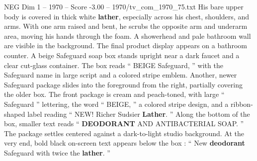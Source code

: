 \begin{textsample}{NEG Dim 1 – 1970 – Score -3.00 – 1970/tv\_com\_1970\_75.txt}
His bare upper body is covered in thick white \textbf{lather}, especially across his chest, shoulders, and arms.
With one arm raised and bent, he scrubs the opposite arm and underarm area, moving his hands through the foam.
A showerhead and pale bathroom wall are visible in the background.
The final product display appears on a bathroom counter.
A beige Safeguard soap box stands upright near a dark faucet and a clear cut-glass container.
The box reads “ BEIGE Safeguard, ” with the Safeguard name in large script and a colored stripe emblem.
Another, newer Safeguard package slides into the foreground from the right, partially covering the older box.
The front package is cream and peach-toned, with large “ Safeguard ” lettering, the word “ BEIGE, ” a colored stripe design, and a ribbon-shaped label reading “ NEW!
Richer Sudsier \textbf{Lather}. ” Along the bottom of the box, smaller text reads “ \textbf{DEODORANT} AND ANTIBACTERIAL SOAP. ” The package settles centered against a dark-to-light studio background.
At the very end, bold black on-screen text appears below the box : “ New \textbf{deodorant} Safeguard with twice the \textbf{lather}. ”

\end{textsample}
